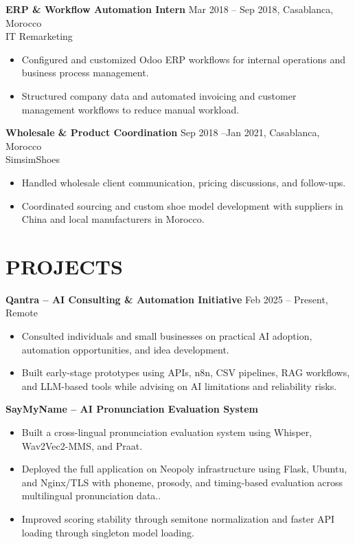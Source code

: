 \documentclass[a4paper,10pt]{article}
\begin{document}
\textbf{ERP \& Workflow Automation Intern} \hfill Mar 2018 -- Sep 2018, Casablanca, Morocco \\
IT Remarketing
\begin{itemize}
\item Configured and customized Odoo ERP workflows for internal operations and business process management.
\item Structured company data and automated invoicing and customer management workflows to reduce manual workload.
\end{itemize}

\textbf{Wholesale \& Product Coordination} \hfill Sep 2018 --Jan 2021, Casablanca, Morocco \\
SimsimShoes
\begin{itemize}
\item Handled wholesale client communication, pricing discussions, and follow-ups.
\item Coordinated sourcing and custom shoe model development with suppliers in China and local manufacturers in Morocco.
\end{itemize}

\section*{PROJECTS}

\textbf{Qantra -- AI Consulting \& Automation Initiative} \hfill Feb 2025 -- Present, Remote
\begin{itemize}
\item Consulted individuals and small businesses on practical AI adoption, automation opportunities, and idea development.
\item Built early-stage prototypes using APIs, n8n, CSV pipelines, RAG workflows, and LLM-based tools while advising on AI limitations and reliability risks.
\end{itemize}

\textbf{SayMyName -- AI Pronunciation Evaluation System}
\begin{itemize}
\item Built a cross-lingual pronunciation evaluation system using Whisper, Wav2Vec2-MMS, and Praat.
\item Deployed the full application on Neopoly infrastructure using Flask, Ubuntu, and Nginx/TLS with phoneme, prosody, and timing-based evaluation across multilingual pronunciation data..
\item Improved scoring stability through semitone normalization and faster API loading through singleton model loading.
\end{itemize}
\end{document}
